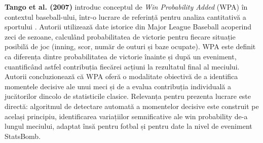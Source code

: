 \textbf{Tango et al. (2007)} introduc conceptul de \textit{Win Probability
Added} (WPA) în contextul baseball-ului, într-o lucrare de referință
pentru analiza cantitativă a sportului \cite{Tango2007}. Autorii utilizează
date istorice din Major League Baseball acoperind zeci de sezoane, calculând
probabilitatea de victorie pentru fiecare situație posibilă de joc (inning,
scor, număr de outuri și baze ocupate). WPA este definit ca diferența dintre
probabilitatea de victorie înainte și după un eveniment, cuantificând astfel
contribuția fiecărei acțiuni la rezultatul final al meciului. Autorii
concluzionează că WPA oferă o modalitate obiectivă de a identifica momentele
decisive ale unui meci și de a evalua contribuția individuală a jucătorilor
dincolo de statisticile clasice. Relevanța pentru prezenta lucrare este
directă: algoritmul de detectare automată a momentelor decisive este
construit pe același principiu, identificarea variațiilor semnificative
ale win probability de-a lungul meciului, adaptat însă pentru fotbal și
pentru date la nivel de eveniment StatsBomb.